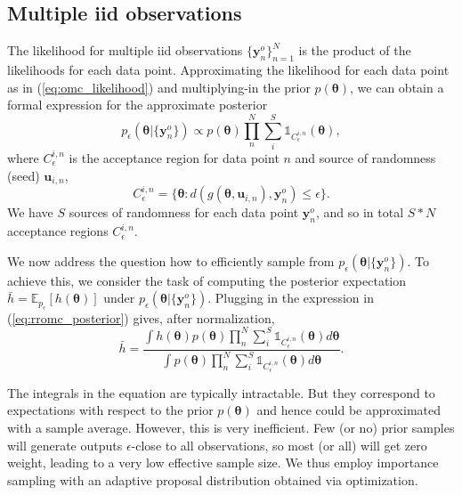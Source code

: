 \documentclass[twoside]{article}
\newlength{\secvspace}
\newlength{\subsecvspace}
\newcommand{\thb}{\boldsymbol{\theta}}
\newcommand{\ub}{\mathbf{u}}
\newcommand{\data}{\mathbf{y}^o}
\newcommand{\E}{\mathbb{E}}
\begin{document}
\vspace{\subsecvspace}
\subsection{Multiple iid observations}
\vspace{\subsecvspace}
\label{subsec:multiple-observations}

The likelihood for multiple iid observations $\{\data_n\}_{n=1}^N$ is the product of the likelihoods for each data point. Approximating the likelihood for each data point as in (\ref{eq:omc_likelihood}) and multiplying-in the prior $p(\thb)$, we can obtain a formal expression for the approximate posterior
\begin{equation}
  \label{eq:rromc_posterior}
  p_{\epsilon}(\thb | \{\data_n\}) \propto p(\thb) \prod_{n}^{N} \sum_{i}^S \mathbb{1}_{C_{\epsilon}^{i,n}}(\thb),
\end{equation}
where $C_{\epsilon}^{i,n}$ is the acceptance region for data point $n$ and source of randomness (seed) $\ub_{i,n}$,
\begin{equation}
C_{\epsilon}^{i,n} = \{\thb : d(g(\thb, \ub_{i,n}), \data_n) \leq \epsilon \}.
\end{equation}
We have $S$ sources of randomness for each data point $\data_n$, and so in total $S*N$ acceptance regions $C_{\epsilon}^{i,n}$.

We now address the question how to efficiently sample from $p_{\epsilon}(\thb | \{\data_n\})$. To achieve this, we consider the task of computing the posterior expectation $\bar{h} = \E_{p_{\epsilon}}[h(\thb)]$ under $p_{\epsilon}(\thb | \{\data_n\})$. Plugging in the expression in (\ref{eq:rromc_posterior}) gives, after normalization,
\begin{equation}
  \label{eq:rromc_expectation}
  \bar{h} = \frac{ \int h(\thb) p(\thb) \prod_n^N \sum_i^S \mathbb{1}_{C_{\epsilon}^{i,n}}(\thb) d\thb}{\int p(\thb) \prod_n^N \sum_i^S \mathbb{1}_{C_{\epsilon}^{i,n}}(\thb) d\thb}.
\end{equation}

The integrals in the equation are typically intractable. But they correspond to expectations with respect to the prior $p(\thb)$ and hence could be approximated with a sample average. However, this is very inefficient. Few (or no) prior samples will generate outputs $\epsilon$-close to all observations, so most (or all) will get zero weight, leading to a very low effective sample size. We thus employ importance sampling with an adaptive proposal distribution obtained via optimization. 
\end{document}
